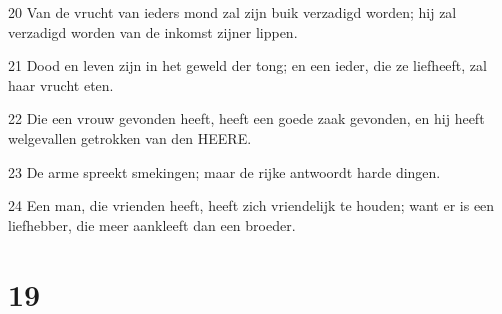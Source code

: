 \par 20 Van de vrucht van ieders mond zal zijn buik verzadigd worden; hij zal verzadigd worden van de inkomst zijner lippen.
\par 21 Dood en leven zijn in het geweld der tong; en een ieder, die ze liefheeft, zal haar vrucht eten.
\par 22 Die een vrouw gevonden heeft, heeft een goede zaak gevonden, en hij heeft welgevallen getrokken van den HEERE.
\par 23 De arme spreekt smekingen; maar de rijke antwoordt harde dingen.
\par 24 Een man, die vrienden heeft, heeft zich vriendelijk te houden; want er is een liefhebber, die meer aankleeft dan een broeder.

\chapter{19}

